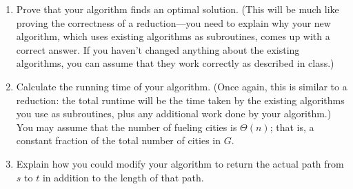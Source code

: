 \documentclass[12 pt, letterpaper]{hmcpset}
\begin{document}
\begin{problem}
\begin{enumerate}
    You have several algorithms for SSSP and/or APSP at your disposal: Dijkstra, Bellman-Ford, Floyd-Warshall, and Johnson's Algorithm. Choose wisely to minimize runtime: some will be faster than others for this problem, so you'll want to choose carefully for full credit.

    \item Prove that your algorithm finds an optimal solution. (This will be much like proving the correctness of a reduction---you need to explain why your new algorithm, which uses existing algorithms as subroutines, comes up with a correct answer. If you haven't changed anything about the existing algorithms, you can assume that they work correctly as described in class.)

    \item Calculate the running time of your algorithm. (Once again, this is similar to a reduction: the total runtime will be the time taken by the existing algorithms you use as subroutines, plus any additional work done by your algorithm.) You may assume that the number of fueling cities is $\Theta(n)$; that is, a constant fraction of the total number of cities in $G$.

    \item Explain how you could modify your algorithm to return the actual path from $s$ to $t$ in addition to the length of that path.
\end{enumerate}
\end{problem}
\end{document}
